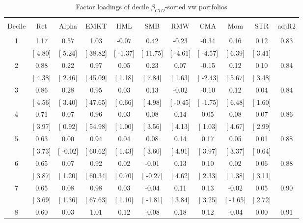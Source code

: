 \documentclass[16pt]{article}
\begin{document}
\begin{table}[!htbp] \centering 
  \caption{Factor loadings of decile $\beta_{CID}$-sorted vw portfolios} 
  \label{} 
\begin{tabular}{@{\extracolsep{0pt}} ccccccccccc} 
\\[-1.8ex]\hline 
\hline \\[-1.8ex] 
Decile & Ret & Alpha & EMKT & HML & SMB & RMW & CMA & Mom & STR & adjR2 \\ 
\hline \\[-1.8ex] 
1 & 1.17 & 0.57 & 1.03 & -0.07 & 0.42 & -0.23 & -0.34 & 0.16 & 0.12 & 0.83 \\ 
 & [ 4.80] & [ 5.24] & [ 38.82] & [ -1.37] & [ 11.75] & [ -4.61] & [ -4.57] & [ 6.39] & [ 3.41] &  \\ 
2 & 0.88 & 0.22 & 0.97 & 0.05 & 0.23 & 0.07 & -0.15 & 0.12 & 0.10 & 0.84 \\ 
 & [ 4.38] & [ 2.46] & [ 45.09] & [ 1.18] & [ 7.84] & [ 1.63] & [ -2.43] & [ 5.67] & [ 3.48] &  \\ 
3 & 0.86 & 0.28 & 0.95 & 0.03 & 0.13 & -0.02 & -0.10 & 0.12 & 0.04 & 0.84 \\ 
 & [ 4.56] & [ 3.40] & [ 47.65] & [ 0.66] & [ 4.98] & [ -0.45] & [ -1.75] & [ 6.48] & [ 1.60] &  \\ 
4 & 0.71 & 0.07 & 0.96 & 0.03 & 0.08 & 0.14 & 0.05 & 0.08 & 0.07 & 0.86 \\ 
 & [ 3.97] & [ 0.92] & [ 54.98] & [ 1.00] & [ 3.56] & [ 4.13] & [ 1.03] & [ 4.67] & [ 2.99] &  \\ 
5 & 0.63 & 0.00 & 0.94 & 0.04 & 0.08 & 0.14 & 0.17 & 0.05 & 0.01 & 0.88 \\ 
 & [ 3.73] & [ -0.02] & [ 60.62] & [ 1.43] & [ 3.60] & [ 4.91] & [ 3.97] & [ 3.37] & [ 0.64] &  \\ 
6 & 0.65 & 0.07 & 0.92 & 0.02 & -0.01 & 0.13 & 0.10 & 0.02 & 0.06 & 0.88 \\ 
 & [ 3.87] & [ 1.20] & [ 60.34] & [ 0.70] & [ -0.27] & [ 4.62] & [ 2.33] & [ 1.38] & [ 3.11] &  \\ 
7 & 0.65 & 0.08 & 0.98 & 0.03 & -0.04 & 0.11 & 0.13 & -0.02 & 0.05 & 0.90 \\ 
 & [ 3.69] & [ 1.36] & [ 67.63] & [ 1.10] & [ -1.81] & [ 3.84] & [ 3.25] & [ -1.65] & [ 2.72] &  \\ 
8 & 0.60 & 0.03 & 1.01 & 0.12 & -0.08 & 0.18 & 0.12 & -0.04 & 0.00 & 0.91 \\ 

\end{tabular}
\end{table}
\end{document}
